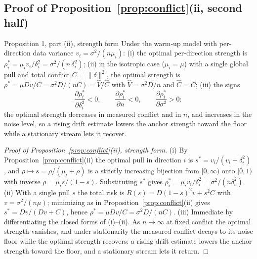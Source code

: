 \subsection{Proof of Proposition~\ref{prop:conflict}(ii, second half)}
\label{app:proof-sign}

\begin{restated}{Proposition 1, part (ii), strength form}
Under the warm-up model with per-direction data variance $v_i = \sigma^2/(n \mu_i)$:
(i) the optimal per-direction strength is
$\rho^*_i = \mu_i v_i/\delta_i^2 = \sigma^2/(n\,\delta_i^2)$;
(ii) in the isotropic case ($\mu_i = \mu$) with a single global pull and total conflict $C = \|\delta\|^2$, the optimal strength is
$\rho^* = \mu D v/C = \sigma^2 D/(n C) = \widehat V/\widehat C$ with $\widehat V = \sigma^2 D/n$ and $\widehat C = C$;
(iii) the signs
\[
  \frac{\partial \rho^*_i}{\partial \delta_i^2} < 0, \qquad
  \frac{\partial \rho^*_i}{\partial n} < 0, \qquad
  \frac{\partial \rho^*_i}{\partial \sigma^2} > 0 :
\]
the optimal strength decreases in measured conflict and in $n$, and increases in the noise level, so a rising drift estimate lowers the anchor strength toward the floor while a stationary stream lets it recover.
\end{restated}

\begin{proof}[Proof of Proposition~\ref{prop:conflict}(ii), strength form]
(i) By Proposition~\ref{prop:conflict}(ii) the optimal pull in direction $i$ is $s^* = v_i/(v_i + \delta_i^2)$, and $\rho \mapsto s = \rho/(\mu_i + \rho)$ is a strictly increasing bijection from $[0,\infty)$ onto $[0,1)$ with inverse $\rho = \mu_i s/(1-s)$.
Substituting $s^*$ gives $\rho^*_i = \mu_i v_i/\delta_i^2 = \sigma^2/(n\delta_i^2)$.
(ii) With a single pull $s$ the total risk is $R(s) = D(1-s)^2 v + s^2 C$ with $v = \sigma^2/(n\mu)$; minimizing as in Proposition~\ref{prop:conflict}(ii) gives $s^* = Dv/(Dv + C)$, hence $\rho^* = \mu D v/C = \sigma^2 D/(nC)$.
(iii) Immediate by differentiating the closed forms of (i)--(ii).
As $n \to \infty$ at fixed conflict the optimal strength vanishes, and under stationarity the measured conflict decays to its noise floor while the optimal strength recovers: a rising drift estimate lowers the anchor strength toward the floor, and a stationary stream lets it return.
\end{proof}

